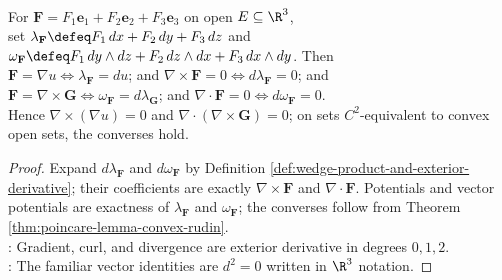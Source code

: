 \begin{theorem} \label{thm:vector-analysis-forms-dictionary} \\
For $\mathbf{F}=F_1\mathbf{e}_1+F_2\mathbf{e}_2+F_3\mathbf{e}_3$ on open $E\subseteq\R^3$,\\
set $\lambda_{\mathbf{F}}\defeq F_1\,dx+F_2\,dy+F_3\,dz$ and $\omega_{\mathbf{F}}\defeq F_1\,dy\wedge dz+F_2\,dz\wedge dx+F_3\,dx\wedge dy$. Then\\
$\mathbf{F}=\nabla u \Longleftrightarrow \lambda_{\mathbf{F}}=du$; and $\nabla\times\mathbf{F}=0 \Longleftrightarrow d\lambda_{\mathbf{F}}=0$; and\\
$\mathbf{F}=\nabla\times\mathbf{G} \Longleftrightarrow \omega_{\mathbf{F}}=d\lambda_{\mathbf{G}}$; and $\nabla\cdot\mathbf{F}=0 \Longleftrightarrow d\omega_{\mathbf{F}}=0$.\\
Hence $\nabla\times(\nabla u)=0$ and $\nabla\cdot(\nabla\times\mathbf{G})=0$; on sets $C^2$-equivalent to convex open sets, the converses hold.
\begin{proof}
Expand $d\lambda_{\mathbf{F}}$ and $d\omega_{\mathbf{F}}$ by Definition \ref{def:wedge-product-and-exterior-derivative}; their coefficients are exactly $\nabla\times\mathbf{F}$ and $\nabla\cdot\mathbf{F}$. Potentials and vector potentials are exactness of $\lambda_{\mathbf{F}}$ and $\omega_{\mathbf{F}}$; the converses follow from Theorem \ref{thm:poincare-lemma-convex-rudin}.\\
: Gradient, curl, and divergence are exterior derivative in degrees $0,1,2$.\\
: The familiar vector identities are $d^2=0$ written in $\R^3$ notation.
\end{proof}
\end{theorem}

